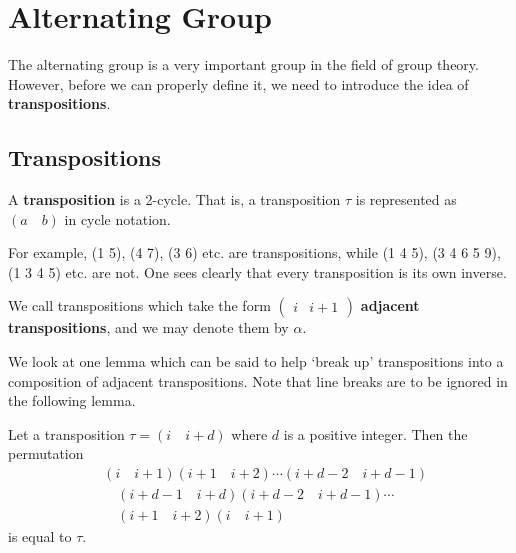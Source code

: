 \section{Alternating Group}
The alternating group is a very important group in the field of group theory. However, before we can properly define it, we need to introduce the idea of \textbf{transpositions}.

\subsection{Transpositions}
\begin{definition}
    A \textbf{transposition} is a 2-cycle. That is, a transposition $\tau$ is represented as $(a\quad b)$ in cycle notation.
\end{definition}
For example, (1 5), (4 7), (3 6) etc. are transpositions, while (1 4 5), (3 4 6 5 9), (1 3 4 5) etc. are not. One sees clearly that every transposition is its own inverse.

We call transpositions which take the form $\begin{pmatrix}i&i+1\end{pmatrix}$ \textbf{adjacent transpositions}, and we may denote them by $\alpha$.

We look at one lemma which can be said to help `break up' transpositions into a composition of adjacent transpositions. Note that line breaks are to be ignored in the following lemma.
\begin{lemma}\label{lemma-decompose-transposition}
    Let a transposition $\tau = (i\quad i+d)$ where $d$ is a positive integer. Then the permutation
    \begin{align*}
        & (i\quad i+1)(i+1\quad i+2)\cdots(i+d-2\quad i+d-1)\\
        &\quad (i+d-1\quad i+d)(i+d-2\quad i+d-1)\cdots\\
        &\quad (i+1\quad i+2)(i\quad i+1)
    \end{align*}
    is equal to $\tau$.
\end{lemma}

\newpage

